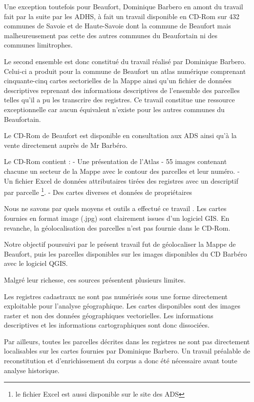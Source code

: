 \documentclass[12pt,a4paper]{report}
\begin{document}
Une exception toutefois pour Beaufort, Dominique Barbero en amont du travail fait par la suite par les ADHS, à fait un travail disponible en CD-Rom sur 432 communes de Savoie et de Haute-Savoie dont la commune de Beaufort mais malheureusement pas cette des autres communes du Beaufortain ni des communes limitrophes.

Le second ensemble est donc constitué du travail réalisé par Dominique Barbero. Celui-ci a produit pour la commune de Beaufort un atlas numérique comprenant cinquante-cinq cartes sectorielles de la Mappe ainsi qu'un fichier de données descriptives reprenant des informations descriptives de l'ensemble des parcelles telles qu'il a pu les transcrire des registres. Ce travail constitue une ressource exceptionnelle car aucun équivalent n'existe pour les autres communes du Beaufortain.

Le CD-Rom de Beaufort est disponible en consultation aux ADS ainsi qu’à la vente directement auprès de Mr Barbéro.

Le CD-Rom contient : 
-	Une présentation de l’Atlas
-	55 images contenant chacune un secteur de la Mappe avec le contour des parcelles et leur numéro.
-	Un fichier Excel de données attributaires tirées des registres avec un descriptif par parcelle \footnote{le fichier Excel est aussi disponible sur le site des ADS}.
-	Des cartes diverses et données de propriétaires 

Nous ne savons par quels moyens et outils a effectué ce travail . Les cartes fournies en format image (.jpg) sont clairement issues d’un logiciel GIS. 
En revanche, la géolocalisation des parcelles n’est pas fournie dans le CD-Rom.

Notre objectif poursuivi par le présent travail fut  de géolocaliser la Mappe de Beaufort, puis les parcelles disponibles sur les images disponibles du CD Barbéro avec le logiciel QGIS. 



Malgré leur richesse, ces sources présentent plusieurs limites.

Les registres cadastraux ne sont pas numérisés sous une forme directement exploitable pour l'analyse géographique. Les cartes disponibles sont des images raster et non des données géographiques vectorielles. Les informations descriptives et les informations cartographiques sont donc dissociées.

Par ailleurs, toutes les parcelles décrites dans les registres ne sont pas directement localisables sur les cartes fournies par Dominique Barbero. Un travail préalable de reconstitution et d'enrichissement du corpus a donc été nécessaire avant toute analyse historique.
\end{document}
